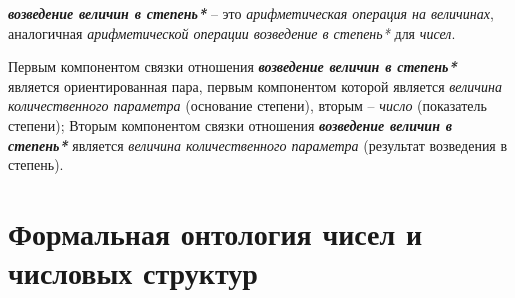 \textbf{\textit{возведение величин в степень*}} -- это \textit{арифметическая операция на величинах}, аналогичная \textit{арифметической операции возведение в степень*} для \textit{чисел}.
		
Первым компонентом связки отношения \textbf{\textit{возведение величин в степень*}} является ориентированная пара, первым компонентом которой является \textit{величина количественного параметра} (основание степени), вторым -- \textit{число} (показатель степени); Вторым компонентом связки отношения \textbf{\textit{возведение величин в степень*}} является \textit{величина количественного параметра} (результат возведения в степень).
%	
	
\begin{SCn}
	
\end{SCn}	

\section{Формальная онтология чисел и числовых структур}
\label{sec_top_ontologies_numbers}

